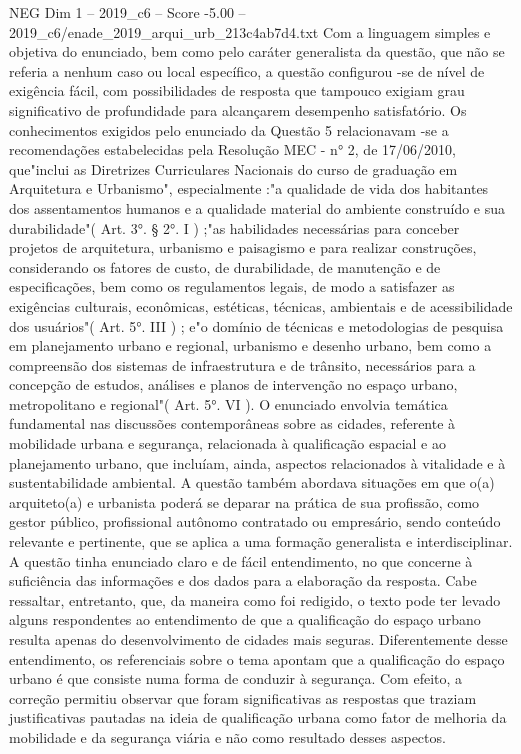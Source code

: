\begin{textsample}{NEG Dim 1 – 2019\_c6 – Score -5.00 – 2019\_c6/enade\_2019\_arqui\_urb\_213c4ab7d4.txt}
Com a linguagem simples e objetiva do enunciado, bem como pelo caráter generalista da questão, que não se referia a nenhum caso ou local específico, a questão configurou -se de nível de exigência fácil, com possibilidades de resposta que tampouco exigiam grau significativo de profundidade para alcançarem desempenho satisfatório.
Os conhecimentos exigidos pelo enunciado da Questão 5 relacionavam -se a recomendações estabelecidas pela Resolução MEC - n{\EmojiFont °} 2, de 17/06/2010, que"inclui as Diretrizes Curriculares Nacionais do curso de graduação em Arquitetura e Urbanismo", especialmente :"a qualidade de vida dos habitantes dos assentamentos humanos e a qualidade material do ambiente construído e sua durabilidade"( Art. 3{\EmojiFont °}. § 2{\EmojiFont °}.
I ) ;"as habilidades necessárias para conceber projetos de arquitetura, urbanismo e paisagismo e para realizar construções, considerando os fatores de custo, de durabilidade, de manutenção e de especificações, bem como os regulamentos legais, de modo a satisfazer as exigências culturais, econômicas, estéticas, técnicas, ambientais e de acessibilidade dos usuários"( Art. 5{\EmojiFont °}.
III ) ; e"o domínio de técnicas e metodologias de pesquisa em planejamento urbano e regional, urbanismo e desenho urbano, bem como a compreensão dos sistemas de infraestrutura e de trânsito, necessários para a concepção de estudos, análises e planos de intervenção no espaço urbano, metropolitano e regional"( Art. 5{\EmojiFont °}.
VI ).
O enunciado envolvia temática fundamental nas discussões contemporâneas sobre as cidades, referente à mobilidade urbana e segurança, relacionada à qualificação espacial e ao planejamento urbano, que incluíam, ainda, aspectos relacionados à vitalidade e à sustentabilidade ambiental.
A questão também abordava situações em que o(a) arquiteto(a) e urbanista poderá se deparar na prática de sua profissão, como gestor público, profissional autônomo contratado ou empresário, sendo conteúdo relevante e pertinente, que se aplica a uma formação generalista e interdisciplinar.
A questão tinha enunciado claro e de fácil entendimento, no que concerne à suficiência das informações e dos dados para a elaboração da resposta.
Cabe ressaltar, entretanto, que, da maneira como foi redigido, o texto pode ter levado alguns respondentes ao entendimento de que a qualificação do espaço urbano resulta apenas do desenvolvimento de cidades mais seguras.
Diferentemente desse entendimento, os referenciais sobre o tema apontam que a qualificação do espaço urbano é que consiste numa forma de conduzir à segurança.
Com efeito, a correção permitiu observar que foram significativas as respostas que traziam justificativas pautadas na ideia de qualificação urbana como fator de melhoria da mobilidade e da segurança viária e não como resultado desses aspectos.

\end{textsample}
